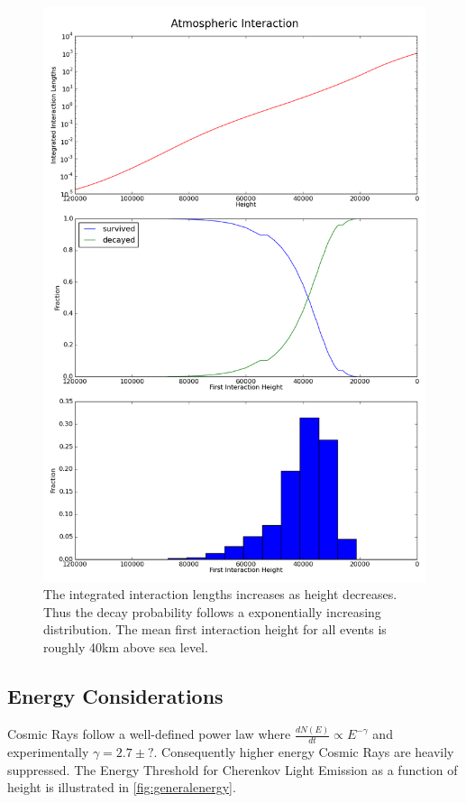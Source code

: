 \documentclass{article}
\begin{document}
\begin{figure}
\begin{center}
\includegraphics[height=0.9\textheight]{generalheight}
\caption{The integrated interaction lengths increases as height decreases. Thus the decay probability follows a exponentially increasing distribution. The mean first interaction height for all events is roughly 40km above sea level.}
\label{fig:generalheight}
\end{center}
\end{figure}

\subsection{Energy Considerations}
Cosmic Rays follow a well-defined power law where $ \frac{dN(E)}{dt} \propto E^{-\gamma} $ and experimentally $ \gamma = 2.7 \pm ? $. Consequently higher energy Cosmic Rays are heavily suppressed. The Energy Threshold for Cherenkov Light Emission as a function of height is illustrated in \ref{fig:generalenergy}. 
\end{document}
